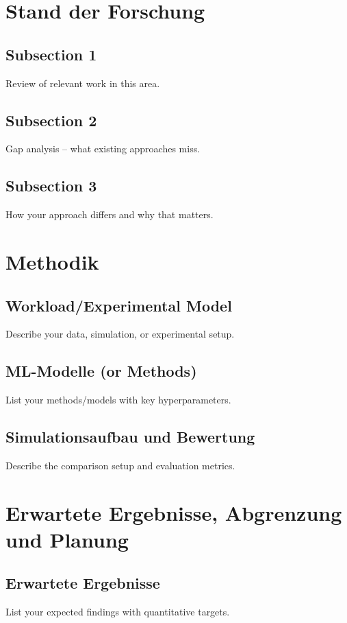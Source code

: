 \documentclass[11pt, a4paper, oneside]{article}
\begin{document}
\section{Stand der Forschung}

\subsection{Subsection 1}
Review of relevant work in this area.

\subsection{Subsection 2}
Gap analysis -- what existing approaches miss.

\subsection{Subsection 3}
How your approach differs and why that matters.

\section{Methodik}

\subsection{Workload/Experimental Model}
Describe your data, simulation, or experimental setup.

\subsection{ML-Modelle (or Methods)}
List your methods/models with key hyperparameters.

\subsection{Simulationsaufbau und Bewertung}
Describe the comparison setup and evaluation metrics.

\section{Erwartete Ergebnisse, Abgrenzung und Planung}

\subsection{Erwartete Ergebnisse}
List your expected findings with quantitative targets.
\end{document}
